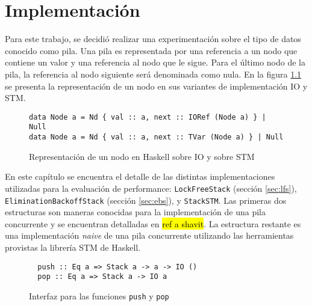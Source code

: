 \chapter{Implementación}\label{ch:implementation}
Para este trabajo, se decidió realizar una experimentación sobre el tipo de datos conocido como pila. Una pila es representada por una referencia a un nodo que contiene un valor y una referencia al nodo que le sigue. Para el último nodo de la pila, la referencia al nodo siguiente será denominada como nula. En la figura \ref{fig:node-rep} se presenta la representación de un nodo en sus variantes de implementación IO y STM.

\begin{figure}[H]
  \centering
  \begin{verbatim}
data Node a = Nd { val :: a, next :: IORef (Node a) } | Null
data Node a = Nd { val :: a, next :: TVar (Node a) } | Null
  \end{verbatim}
  \caption{Representación de un nodo en Haskell sobre IO y sobre STM}
  \label{fig:node-rep}
\end{figure}

En este capítulo se encuentra el detalle de las distintas implementaciones utilizadas para la evaluación de performance: \texttt{LockFreeStack} (sección \ref{sec:lfs}), \texttt{EliminationBackoffStack} (sección \ref{sec:ebs}), y \texttt{StackSTM}. Las primeras dos estructuras son maneras conocidas para la implementación de una pila concurrente y se encuentran detalladas en \hl{ref a shavit}. La estructura restante es una implementación \emph{naive} de una pila concurrente utilizando las herramientas provistas la librería STM de Haskell.



\begin{figure}[H]
  \centering
  \begin{verbatim}
  push :: Eq a => Stack a -> a -> IO ()
  pop :: Eq a => Stack a -> IO a
  \end{verbatim}
  \caption{Interfaz para las funciones \texttt{push} y \texttt{pop}}
  \label{stackInterface}
\end{figure}

